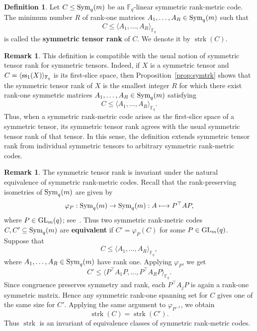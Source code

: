 \documentclass[11pt,a4paper,reqno]{article}
\numberwithin{equation}{section}
\theoremstyle{definition}
\newtheorem{definition}[theorem]{Definition}
\newtheorem{remark}[theorem]{Remark}
\renewcommand{\longrightarrow}{\to}
\newcommand{\GL}{\textnormal{GL}_m(q)}
\def\ss{\textup{ss}}
\newcommand{\Sym}{{\textnormal{Sym}}}
\begin{document}
\begin{definition}\label{def:symtrk}
Let \(C\leq \Sym_q(m)\) be an \(\mathbb F_q\)-linear symmetric rank-metric code. The minimum number \(R\) of rank-one matrices
\(A_1,\ldots,A_R\in \Sym_q(m)\) such that
\[
C\leq \langle A_1,\ldots,A_R\rangle_{\mathbb F_q}
\]
is called the \textbf{symmetric tensor rank} of \(C\). We denote it by
\(\operatorname{strk}(C)\).
\end{definition}

\begin{remark}
This definition is compatible with the usual
notion of symmetric tensor rank for symmetric tensors. Indeed, if \(X\) is a
symmetric tensor and \(C=\langle \ss_1(X)\rangle_{\mathbb F_q}\) is its first-slice
space, then Proposition~\ref{prop:symtrk} shows that
the symmetric tensor rank of \(X\) is the smallest integer \(R\) for which there
exist rank-one symmetric matrices \(A_1,\ldots,A_R\in\Sym_q(m)\) satisfying
\[
C\leq \langle A_1,\ldots,A_R\rangle_{\mathbb F_q}.
\]
Thus, when a symmetric rank-metric code arises as the first-slice space of a
symmetric tensor, its symmetric tensor rank agrees with the usual symmetric
tensor rank of that tensor. In this sense, the definition extends symmetric
tensor rank from individual symmetric tensors to arbitrary symmetric
rank-metric codes.
\end{remark}


\begin{remark}
The symmetric tensor rank is invariant under the natural equivalence of
symmetric rank-metric codes. Recall that the rank-preserving isometries of
\(\Sym_q(m)\) are given by
\[
\varphi_P:\Sym_q(m)\longrightarrow \Sym_q(m):
A\longmapsto P^\top A P,
\]
where \(P\in \GL\); see~\cite{wan1996geometry}. Thus two symmetric
rank-metric codes \(C,C'\subseteq \Sym_q(m)\) are \textbf{equivalent} if
\(C'=\varphi_P(C)\) for some \(P\in \GL\). Suppose that
\[
C\leq \langle A_1,\ldots,A_R\rangle_{\mathbb F_q},
\]
where \(A_1,\ldots,A_R\in\Sym_q(m)\) have rank one. Applying \(\varphi_P\), we get
\[
C'\leq
\langle P^\top A_1P,\ldots,P^\top A_RP\rangle_{\mathbb F_q}.
\]
Since congruence preserves symmetry and rank, each \(P^\top A_jP\) is again a
rank-one symmetric matrix. Hence any symmetric rank-one spanning set for \(C\)
gives one of the same size for \(C'\). Applying the same argument to
\(\varphi_{P^{-1}}\), we obtain
\[
\operatorname{strk}(C)=\operatorname{strk}(C').
\]
Thus \(\operatorname{strk}\) is an invariant of equivalence classes of
symmetric rank-metric codes.
\end{remark}
\end{document}
